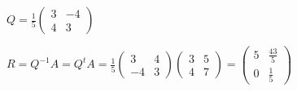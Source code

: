 		  	$Q = \frac{1}{5} \begin{pmatrix} 3 & -4 \\ 4 & 3 \end{pmatrix} 	 $ \\
		  	
		  	\vspace{0.2cm}
		  	
		  	$R = Q^{-1} A = Q^t A = \frac{1}{5}\begin{pmatrix} 3 & 4 \\ -4 & 3 \end{pmatrix}  \begin{pmatrix} 3 & 5 \\ 4 & 7 \end{pmatrix} =  \begin{pmatrix} 5 & \frac{43}{5} \\ 0 & \frac{1}{5}  \end{pmatrix} $
